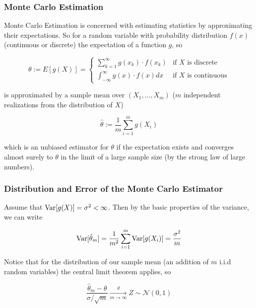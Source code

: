 \subsubsection{Monte Carlo Estimation}
Monte Carlo Estimation is concerned with estimating statistics by approximating their expectations. So for a random variable with
probability distribution $f(x)$ (continuous or discrete) the expectation of a function $g$, so

\begin{equation}
    \theta := E[g(X)] = \begin{cases}
        \sum_{k=1}^{\infty} g(x_k) \cdot f(x_k) & \text{if } X \text{ is discrete} \\
        \int_{-\infty}^{\infty} g(x) \cdot f(x) dx & \text{if } X \text{ is continuous}
    \end{cases}
\label{eq:mc_est}
\end{equation}

is approximated by a sample mean over $(X_1, \dots, X_m)$ ($m$ independent realizations from the distribution of $X$)

\begin{equation}
    \hat{\theta} := \frac{1}{m} \sum_{i=1}^{m} g(X_i)
\end{equation}

which is an unbiased estimator for $\theta$ if the expectation exists and converges almost surely to $\theta$ in the limit of a large sample size (by the strong law of large numbers).

\subsubsection{Distribution and Error of the Monte Carlo Estimator}
Assume that $\operatorname{Var}[g(X)] = \sigma^2 < \infty$. Then by the basic properties of the variance, we can write

\begin{equation}
    \operatorname{Var}[\hat{\theta}_m] = \frac{1}{m^2} \sum_{i=1}^{m} \operatorname{Var}[g(X_i)] = \frac{\sigma^2}{m}
\end{equation}

Notice that for the distribution of our sample mean (an addition of $m$ i.i.d random variables) the central limit theorem applies, so

\begin{equation}
    \frac{\hat{\theta}_m - \theta}{\sigma / \sqrt{m}} \xrightarrow[m \rightarrow \infty]{d} Z \sim \mathcal{N}(0, 1)
\end{equation}

